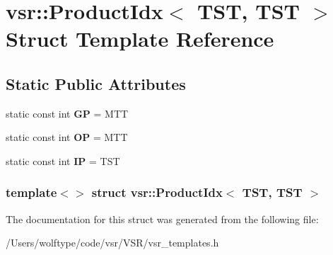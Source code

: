 \hypertarget{structvsr_1_1_product_idx_3_01_t_s_t_00_01_t_s_t_01_4}{\section{vsr\-:\-:Product\-Idx$<$ T\-S\-T, T\-S\-T $>$ Struct Template Reference}
\label{structvsr_1_1_product_idx_3_01_t_s_t_00_01_t_s_t_01_4}
}
\subsection*{Static Public Attributes}
\begin{DoxyCompactItemize}
\item 
\hypertarget{structvsr_1_1_product_idx_3_01_t_s_t_00_01_t_s_t_01_4_af43ada8475d278be63895c16ebb93608}{static const int {\bfseries G\-P} = M\-T\-T}\label{structvsr_1_1_product_idx_3_01_t_s_t_00_01_t_s_t_01_4_af43ada8475d278be63895c16ebb93608}

\item 
\hypertarget{structvsr_1_1_product_idx_3_01_t_s_t_00_01_t_s_t_01_4_a9e953182068edb4503a600192f8dfe4a}{static const int {\bfseries O\-P} = M\-T\-T}\label{structvsr_1_1_product_idx_3_01_t_s_t_00_01_t_s_t_01_4_a9e953182068edb4503a600192f8dfe4a}

\item 
\hypertarget{structvsr_1_1_product_idx_3_01_t_s_t_00_01_t_s_t_01_4_a4bc310da392331519a24a628a7d69558}{static const int {\bfseries I\-P} = T\-S\-T}\label{structvsr_1_1_product_idx_3_01_t_s_t_00_01_t_s_t_01_4_a4bc310da392331519a24a628a7d69558}

\end{DoxyCompactItemize}
\subsubsection*{template$<$$>$ struct vsr\-::\-Product\-Idx$<$ T\-S\-T, T\-S\-T $>$}



The documentation for this struct was generated from the following file\-:\begin{DoxyCompactItemize}
\item 
/\-Users/wolftype/code/vsr/\-V\-S\-R/vsr\-\_\-templates.\-h\end{DoxyCompactItemize}
